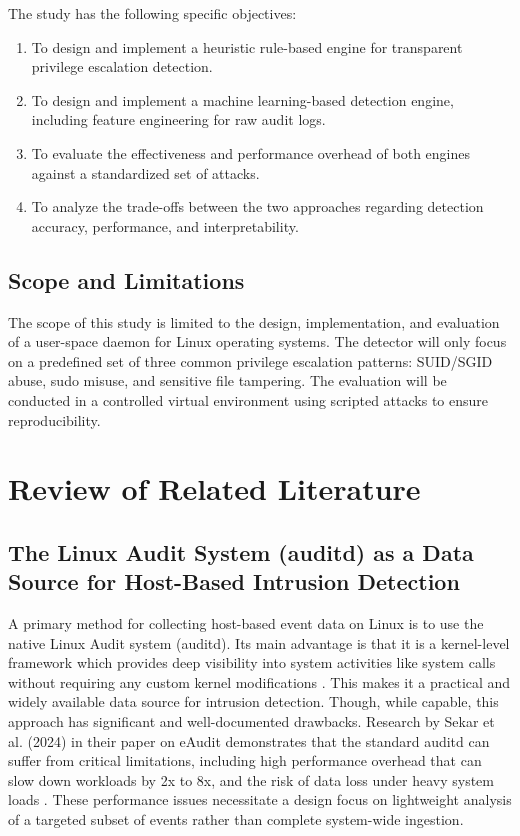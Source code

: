 \documentclass[journal]{./IEEEtran}
\begin{document}
The study has the following specific objectives:
\begin{enumerate} 
\item To design and implement a heuristic rule-based engine for transparent privilege escalation detection. 
\item To design and implement a machine learning-based detection engine, including feature engineering for raw audit logs. 
\item To evaluate the effectiveness and performance overhead of both engines against a standardized set of attacks. 
\item To analyze the trade-offs between the two approaches regarding detection accuracy, performance, and interpretability. 
\end{enumerate}

\subsection{Scope and Limitations}
The scope of this study is limited to the design, implementation, and evaluation of a user-space daemon for Linux operating systems. The detector will only focus on a predefined set of three common privilege escalation patterns: SUID/SGID abuse, sudo misuse, and sensitive file tampering. The evaluation will be conducted in a controlled virtual environment using scripted attacks to ensure reproducibility.

\section{Review of Related Literature}
\subsection{The Linux Audit System (auditd) as a Data Source for Host-Based Intrusion Detection}
A primary method for collecting host-based event data on Linux is to use the native Linux Audit system (auditd). Its main advantage is that it is a kernel-level framework which provides deep visibility into system activities like system calls without requiring any custom kernel modifications \cite{groenewoud2024}. This makes it a practical and widely available data source for intrusion detection. Though, while capable, this approach has significant and well-documented drawbacks. Research by Sekar et al. (2024) in their paper on eAudit demonstrates that the standard auditd can suffer from critical limitations, including high performance overhead that can slow down workloads by 2x to 8x, and the risk of data loss under heavy system loads \cite{sekar2024}. These performance issues necessitate a design focus on lightweight analysis of a targeted subset of events rather than complete system-wide ingestion.
\end{document}
